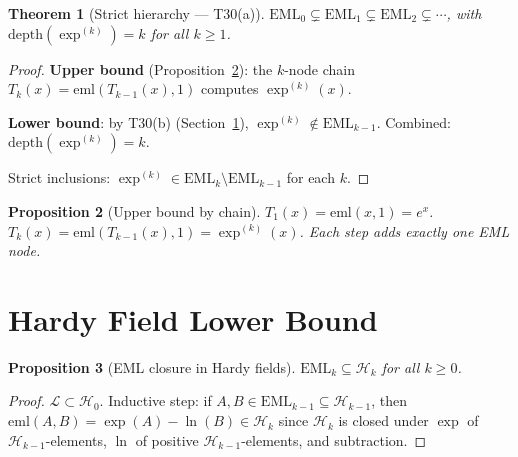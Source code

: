 \documentclass[12pt,a4paper]{article}
\newtheorem{theorem}{Theorem}[section]
\newtheorem{proposition}[theorem]{Proposition}
\theoremstyle{definition}
\theoremstyle{remark}
\begin{document}
\begin{theorem}[Strict hierarchy --- T30(a)]\label{thm:hierarchy}
$\mathrm{EML}_0 \subsetneq \mathrm{EML}_1 \subsetneq \mathrm{EML}_2 \subsetneq \cdots$,
with $\mathrm{depth}(\exp^{(k)}) = k$ for all $k \geq 1$.
\end{theorem}

\begin{proof}
\textbf{Upper bound} (Proposition~\ref{prop:ub}): the $k$-node chain
$T_k(x) = \mathrm{eml}(T_{k-1}(x), 1)$ computes $\exp^{(k)}(x)$.

\textbf{Lower bound}: by T30(b) (Section~\ref{sec:hardy}),
$\exp^{(k)} \notin \mathrm{EML}_{k-1}$.
Combined: $\mathrm{depth}(\exp^{(k)}) = k$.

Strict inclusions: $\exp^{(k)} \in \mathrm{EML}_k \setminus \mathrm{EML}_{k-1}$
for each $k$.
\end{proof}

\begin{proposition}[Upper bound by chain]\label{prop:ub}
$T_1(x) = \mathrm{eml}(x,1) = e^x$.
$T_k(x) = \mathrm{eml}(T_{k-1}(x), 1) = \exp^{(k)}(x)$.
Each step adds exactly one EML node.
\end{proposition}

\section{Hardy Field Lower Bound}
\label{sec:hardy}

\begin{proposition}[EML closure in Hardy fields]\label{prop:closure}
$\mathrm{EML}_k \subseteq \mathcal{H}_k$ for all $k \geq 0$.
\end{proposition}
\begin{proof}
$\mathcal{L} \subset \mathcal{H}_0$.  Inductive step: if $A,B \in \mathrm{EML}_{k-1}
\subseteq \mathcal{H}_{k-1}$, then $\mathrm{eml}(A,B) = \exp(A) - \ln(B) \in \mathcal{H}_k$
since $\mathcal{H}_k$ is closed under $\exp$ of $\mathcal{H}_{k-1}$-elements,
$\ln$ of positive $\mathcal{H}_{k-1}$-elements, and subtraction.
\end{proof}
\end{document}
